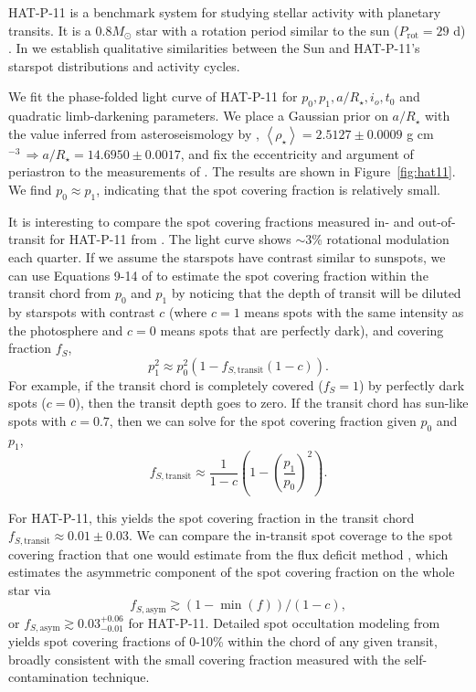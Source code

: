 HAT-P-11 is a benchmark system for studying stellar activity with planetary transits. It is a $0.8 M_\odot$ star with a rotation period similar to the sun ($P_\mathrm{rot} = 29$ d) \citep{bakos2010,Sanchis-Ojeda2011,Southworth2011,Deming2011}. In \citet{Morris2017a,Morris2017b,Morris2018d} we establish qualitative similarities between the Sun and HAT-P-11's starspot distributions and activity cycles. 

We fit the phase-folded \kepler light curve of HAT-P-11 for $p_0, p_1, a/R_\star, i_o, t_0$ and quadratic limb-darkening parameters. We place a Gaussian prior on $a/R_\star$ with the value inferred from asteroseismology by \citet{Christensen-Dalsgaard2010}, $\left< \rho_\star \right> = 2.5127 \pm 0.0009 $ g cm$^{-3} \, \Rightarrow a/R_\star= 14.6950 \pm 0.0017$, and fix the eccentricity and argument of periastron to the measurements of \citet{Winn2010}. The results are shown in Figure~\ref{fig:hat11}. We find $p_0 \approx p_1$, indicating that the spot covering fraction is relatively small. 

It is interesting to compare the spot covering fractions measured in- and out-of-transit for HAT-P-11 from \citet{Morris2017a}. The \kepler light curve shows $\sim3$\% rotational modulation each quarter. If we assume the starspots have contrast similar to sunspots, we can use Equations 9-14 of \citet{Morris2017a} to estimate the spot covering fraction within the transit chord from $p_0$ and $p_1$ by noticing that the depth of transit will be diluted by starspots with contrast $c$ (where $c=1$ means spots with the same intensity as the photosphere and $c=0$ means spots that are perfectly dark), and covering fraction $f_S$,
\begin{equation}
p_1^2 \approx p_0^2 (1 - f_{S,\mathrm{transit}} (1-c)).
\end{equation}
For example, if the transit chord is completely covered ($f_S=1$) by perfectly dark spots ($c=0$), then the transit depth goes to zero. If the transit chord has sun-like spots with $c=0.7$, then we can solve for the spot covering fraction given $p_0$ and $p_1$,
\begin{equation}
f_{S,\mathrm{transit}} \approx \frac{1}{1-c}\left(1 - \left(\frac{p_1}{p_0} \right)^2\right). \label{eqn:fs_transit}
\end{equation}

For HAT-P-11, this yields the spot covering fraction in the transit chord $f_{S,\mathrm{transit}} \approx 0.01 \pm 0.03$. We can compare the in-transit spot coverage to the spot covering fraction that one would estimate from the flux deficit method \citep{Morris2017a}, which estimates the asymmetric component of the spot covering fraction on the whole star via
\begin{equation}
f_{S, \mathrm{asym}} \gtrsim (1 - \min(f))/(1 - c),
\end{equation}
or $f_{S, \mathrm{asym}} \gtrsim 0.03_{-0.01}^{+0.06}$ for HAT-P-11. Detailed spot occultation modeling from \citet{Morris2017a} yields spot covering fractions of 0-10\% within the chord of any given transit, broadly consistent with the small covering fraction measured with the self-contamination technique.  

